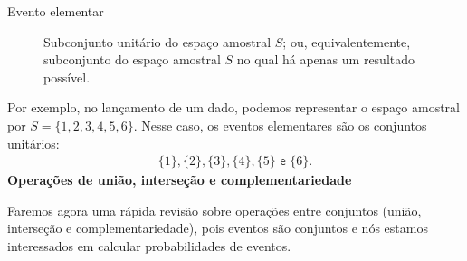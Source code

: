 \begin{description}
\item[{Evento elementar}]
Subconjunto unitário do espaço amostral \(S\); ou, equivalentemente, subconjunto do espaço amostral \(S\) no qual há apenas um resultado possível.
\end{description}

Por exemplo, no lançamento de um dado, podemos representar o espaço amostral por \(S=\{1,2,3,4,5,6\}\). Nesse caso, os eventos elementares são os conjuntos unitários:
\begin{equation*}
\begin{split}\{1\}, \{2\}, \{3\}, \{4\}, \{5\} \textsf{ e } \{6\}.\end{split}
\end{equation*}
\textbf{Operações de união, interseção e complementariedade}

Faremos agora uma rápida revisão sobre operações entre conjuntos (união, interseção e complementariedade), pois eventos são conjuntos e nós estamos interessados em calcular probabilidades de eventos.

